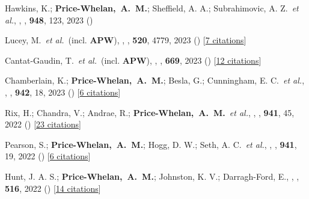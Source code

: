 \item[{\color{deemph}\scriptsize105}]Hawkins, K.; \textbf{Price-Whelan,~A.~M.}; Sheffield, A. A.; Subrahimovic, A. Z.~\textit{et al.}, , \apj, \textbf{948}, 123, 2023 ()

\item[{\color{deemph}\scriptsize104}]Lucey, M.~\textit{et al.}~(incl. \textbf{APW}), , \mnras, \textbf{520}, 4779, 2023 () [\href{http://adsabs.harvard.edu/abs/2023MNRAS.520.4779L}{7 citations}]

\item[{\color{deemph}\scriptsize103}]Cantat-Gaudin, T.~\textit{et al.}~(incl. \textbf{APW}), , \aanda, \textbf{669}, 2023 () [\href{http://adsabs.harvard.edu/abs/2023A&A...669A..55C}{12 citations}]

\item[{\color{deemph}\scriptsize102}]Chamberlain, K.; \textbf{Price-Whelan,~A.~M.}; Besla, G.; Cunningham, E. C.~\textit{et al.}, , \apj, \textbf{942}, 18, 2023 () [\href{http://adsabs.harvard.edu/abs/2023ApJ...942...18C}{6 citations}]

\item[{\color{deemph}\scriptsize101}]Rix, H.; Chandra, V.; Andrae, R.; \textbf{Price-Whelan,~A.~M.}~\textit{et al.}, , \apj, \textbf{941}, 45, 2022 () [\href{http://adsabs.harvard.edu/abs/2022ApJ...941...45R}{23 citations}]

\item[{\color{deemph}\scriptsize100}]Pearson, S.; \textbf{Price-Whelan,~A.~M.}; Hogg, D. W.; Seth, A. C.~\textit{et al.}, , \apj, \textbf{941}, 19, 2022 () [\href{http://adsabs.harvard.edu/abs/2022ApJ...941...19P}{6 citations}]

\item[{\color{deemph}\scriptsize99}]Hunt, J. A. S.; \textbf{Price-Whelan,~A.~M.}; Johnston, K. V.; Darragh-Ford, E., , \mnras, \textbf{516}, 2022 () [\href{http://adsabs.harvard.edu/abs/2022MNRAS.516L...7H}{14 citations}]

